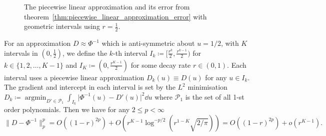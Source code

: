 \documentclass[manuscript,review]{acmart}
\DeclareMathOperator*{\argmin}{argmin} %
\begin{document}
\begin{figure}[htb]
\centering

\hfil
{}\hfil
{}\hfil

\caption{The piecewise linear approximation and its error from theorem~\ref{thm:piecewise_linear_approximation_error} with geometric intervals using $ r = \tfrac{1}{2} $.}
\label{fig:piecewise_linear_approximation}
\end{figure}

\begin{theorem}
\label{thm:piecewise_linear_approximation_error}
For an approximation $ D \approx \Phi^{-1}$ which is anti-symmetric about $ u=1/2$, with $ K $ intervals in $ (0, \tfrac{1}{2}) $, we define the $ k $-th interval $ I_k \coloneqq [\tfrac{r^k}{2}, \tfrac{r^{k-1}}{2})$ for $ k \in \{1,2,\ldots, K-1\} $ and $ I_K \coloneqq (0, \tfrac{r^{K-1}}{2}) $ for some decay rate $ r \in(0,1) $. Each interval uses a piecewise linear approximation $ D_k(u) \equiv D(u) $ for any $ u \in I_k $. The gradient and intercept in each interval is set by the $ L^2 $ minimisation $ D_k \coloneqq \argmin_{D' \in \mathcal{P}_1} \int_{I_k}\lvert\Phi^{-1}(u) - D'(u)\rvert^2 \dd{u} $ where $ \mathcal{P}_1 $  is the set of all 1-st order polynomials. Then we have for any $ 2 \leq p < \infty  $
\begin{equation*}
\lVert D - \Phi^{-1}\rVert_p^p 
= O((1-r)^{2p}) +
O(r^{K-1} {\log}^{-p/2}(r^{1-K}\sqrt{2/\pi}))  = O((1-r)^{2p}) +
o(r^{K-1}).
\end{equation*}
\end{theorem}
\end{document}
